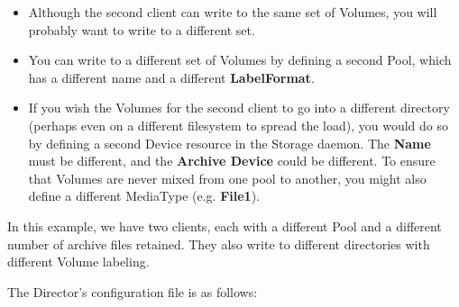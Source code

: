 \begin{itemize}
\item Although the second client can write to the same set of  Volumes, you
   will probably want to write to a different  set.
\item You can write to a different set of Volumes by defining  a second Pool,
   which has a different name and a different  {\bf LabelFormat}.
\item If you wish the Volumes for the second client to go into  a different
   directory (perhaps even on a different filesystem  to spread the load), you
   would do so by defining a second  Device resource in the Storage daemon. The
{\bf Name}  must be different, and the {\bf Archive Device} could  be
different. To ensure that Volumes are never mixed from  one pool to another,
you might also define a different  MediaType (e.g. {\bf File1}).
\end{itemize}

In this example, we have two clients, each with a different Pool and a
different number of archive files retained. They also write to different
directories with different Volume labeling.

The Director's configuration file is as follows:

